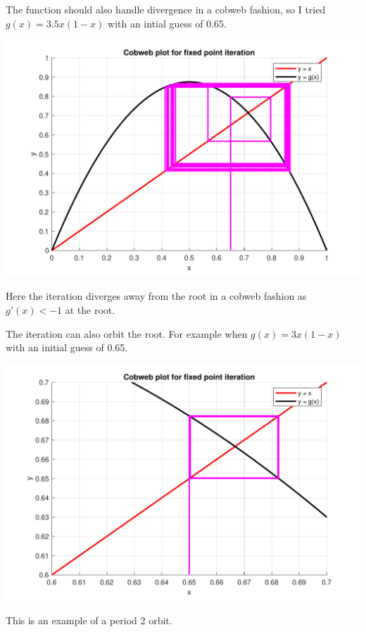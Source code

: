 \documentclass[a4paper,11pt]{article}
\begin{document}
\begin{enumerate}
	The function should also handle divergence in a cobweb fashion, so I 
	tried $g(x) = 3.5x(1-x)$ with an intial guess of 0.65.
	
	\begin{center}
		\includegraphics[scale=0.6]{images/Q1d_divcob.pdf}
	\end{center}
	Here the iteration diverges away from the root in a cobweb fashion as 
	$g'(x)<-1$ at the root.
	
	The iteration can also orbit the root. For example when $g(x)=3x(1-x)$ 
	with an initial guess of 0.65.
	
	\begin{center}
		\includegraphics[scale=0.6]{images/Q1d_orbit.pdf}
	\end{center}
	This is an example of a period 2 orbit.
	
\end{enumerate}
\end{document}
